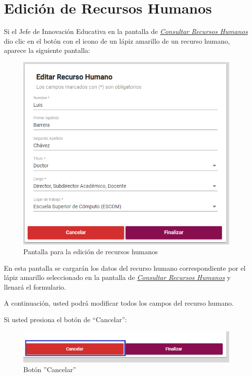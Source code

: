             \section{Edición de Recursos Humanos}
                Si el Jefe de Innovación Educativa en la pantalla de \hyperlink{consultarRH}{\textit{Consultar Recursos Humanos}} dio clic en el botón con el icono de un lápiz amarillo de un recurso humano, aparece la siguiente pantalla:
                
                \begin{figure}[!hbtp]
                    \centering
                    \hypertarget{editarUs}{\includegraphics[width=0.6\linewidth]{images/SP1/EditarRH}}
                    \caption{Pantalla para la edición de recursos humanos}
                    \label{editarrh}
                \end{figure}
                
                En esta pantalla se cargarán los datos del recurso humano correspondiente por el lápiz amarillo seleccionado en la pantalla de \hyperlink{consultarRH}{\textit{Consultar Recursos Humanos}} y llenará el formulario.
            
                A continuación, usted podrá modificar todos los campos del recurso humano.
                               
                Si usted presiona el botón de “Cancelar”:
                
                \begin{figure}[!hbtp]
                    \centering
                    \hypertarget{cancel2}{\includegraphics[width=0.7\linewidth]{images/SP1/BtnCancelar2}}
                    \caption{Botón ''Cancelar''}
                    \label{cancel2}
                \end{figure}
                
